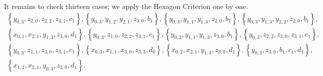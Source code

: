 It remains to check thirteen cases; we apply the Hexagon Criterion one by one.
\begin{gather*}
\left\{ y_{0,3}, z_{2,0}, z_{2,2}, z_{3,1}, c_1 \right\}, 
 \left\{ y_{0,3}, y_{1,2}, y_{2,1}, z_{3,0}, b_1 \right\}, 
\left\{ y_{0,3}, y_{1,1}, y_{1,3}, z_{2,0}, b_1 \right\}, 
      \left\{ y_{0,3}, y_{1,3}, y_{2,2}, z_{2,0}, b_1 \right\}, \\
      \left\{ x_{0,1}, x_{2,1}, y_{1,3}, z_{3,0}, d_1 \right\}, 
  \left\{ y_{0,3}, z_{1,0}, z_{2,2}, z_{3,1}, c_1 \right\}, 
  \left\{ y_{0,2}, y_{1,1}, y_{1,3}, z_{3,0}, b_1 \right\}, 
 \left\{ y_{0,3}, z_{2,2}, z_{3,0}, z_{3,1}, c_1 \right\}, \\
  \left\{ y_{0,3}, z_{1,1}, z_{3,0}, z_{3,1}, c_1 \right\}, 
  \left\{ x_{0,3}, x_{1,1}, x_{3,0}, z_{3,3}, d_0 \right\}, 
  \left\{ x_{0,2}, x_{2,1}, y_{1,3}, z_{3,0}, d_1 \right\}, 
  \left\{ y_{0,3}, z_{3,0}, b_1, c_1, d_1 \right\}, \\
  \left\{ x_{1,2}, x_{2,1}, y_{0,3}, z_{3,0}, d_1 \right\}.
\end{gather*}

